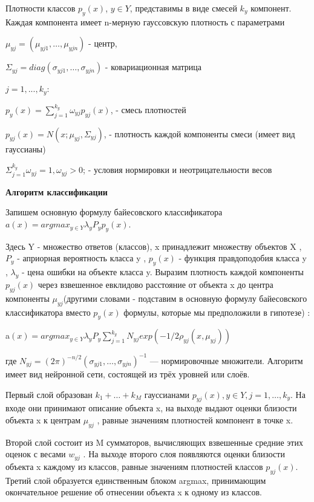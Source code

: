 Плотности классов $p_y(x)$, $y \in Y $, представимы в виде смесей $k_y$ компонент. Каждая компонента имеет n-мерную гауссовскую плотность с параметрами 

$\mu _{yj} = (\mu _{yj1}, \dots , \mu _{yjn}) $ - центр, 

$\Sigma _{yj} = diag(\sigma  _{yj1}, \dots , \sigma  _{yjn})$ - ковариационная матрица  

$j = 1, . . . , k_y$:

 $p_y(x) = \sum ^{k _y} _{j = 1} \omega _{yj} p _{yj}(x)$,  - смесь плотностей  
 
$p_{yj}(x) = N(x; \mu _{yj} ,\Sigma _{yj})$,  - плотность каждой компоненты смеси (имеет вид гауссианы)  

 $\Sigma ^{k_y} _{j = 1} \omega _{yj} = 1, \omega _{yj} > 0$; - условия нормировки и неотрицательности весов

\textbf{Алгоритм классификации}

Запишем основную формулу байесовского классификатора $a(x) = argmax _{y \in Y} \lambda _y P _y p_y(x)$.    

Здесь Y - множество ответов (классов), x принадлежит множеству объектов X , $P_y$ - априорная вероятность класса y , $p_y(x)$ - функция правдоподобия класса y , $\lambda_{y}$ - цена ошибки на объекте класса y. Выразим плотность каждой компоненты $p_{yj}(x)$ через взвешенное евклидово расстояние от объекта x до центра компоненты $\mu _{yj}$(другими словами - подставим в основную формулу байесовского классификатора вместо $p_y(x)$ формулы, которые мы предположили в гипотезе) :


a$(x) = argmax _{y \in Y} \lambda _y P _y \sum ^{k_y} _{j = 1} N _{yj} exp(-1/2 \rho  _{yj} (x, \mu _{yj}))$


где $N _{yj} = (2\pi)^{-n/2} (\sigma _{yj1},\dots , \sigma _{yjn})^{-1}$ — нормировочные множители. Алгоритм имеет вид нейронной сети, состоящей из трёх уровней или слоёв.

Первый слой образован $k_1 + \dots+ k_M$ гауссианами $p_{yj}(x), y \in Y , j = 1, \dots, k_y$. На входе они принимают описание объекта x, на выходе выдают оценки близости объекта x к центрам $\mu _{yj}$ , равные значениям плотностей компонент в точке x.  

Второй слой состоит из M сумматоров, вычисляющих взвешенные средние этих оценок с весами $w_{yj}$ . На выходе второго слоя появляются оценки близости объекта x каждому из классов, равные значениям плотностей классов $p_{yj}(x)$.
Третий слой образуется единственным блоком argmax, принимающим окончательное решение об отнесении объекта x к одному из классов.  

